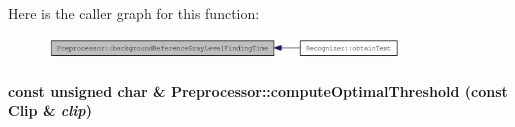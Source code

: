 Here is the caller graph for this function:\nopagebreak
\begin{figure}[H]
\begin{center}
\leavevmode
\includegraphics[width=264pt]{class_preprocessor_001ec84b94a5d92a2bce6b854b4d3e7d_icgraph}
\end{center}
\end{figure}
\hypertarget{class_preprocessor_ac2f414d6f4f917419f33f6067eb8634}{
\paragraph[computeOptimalThreshold]{\setlength{\rightskip}{0pt plus 5cm}const unsigned char \& Preprocessor::computeOptimalThreshold (const {\bf Clip} \& {\em clip})}\hfill}
\label{class_preprocessor_ac2f414d6f4f917419f33f6067eb8634}



